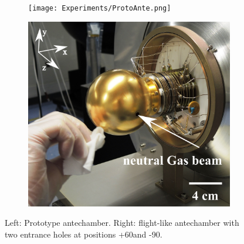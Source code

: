 	\begin{figure}[h!]
		\begin{subfigure}{.5\textwidth}
			\centering
			\texttt{[image: Experiments/ProtoAnte.png]}
		\end{subfigure}
		\begin{subfigure}{.5\textwidth}
			\centering
			\includegraphics[width=.8\textwidth]{Experiments/FlightAnte.png}
		\end{subfigure}
		\caption{Left: Prototype antechamber. Right: flight-like antechamber with two entrance holes at positions +60\degree and -90\degree.}
		\label{fig:expAntchamPic}
	\end{figure}

